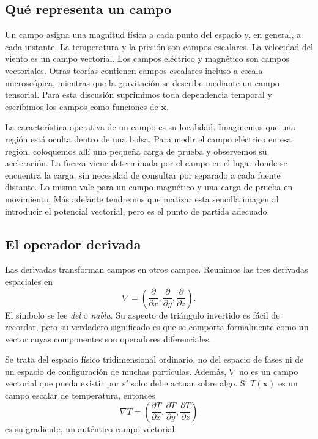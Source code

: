 \subsection{Qué representa un campo}

Un campo asigna una magnitud física a cada punto del espacio y, en general, a cada instante. La temperatura y la presión son campos escalares. La velocidad del viento es un campo vectorial. Los campos eléctrico y magnético son campos vectoriales. Otras teorías contienen campos escalares incluso a escala microscópica, mientras que la gravitación se describe mediante un campo tensorial. Para esta discusión suprimimos toda dependencia temporal y escribimos los campos como funciones de \(\mathbf x\).

La característica operativa de un campo es su localidad. Imaginemos que una región está oculta dentro de una bolsa. Para medir el campo eléctrico en esa región, coloquemos allí una pequeña carga de prueba y observemos su aceleración. La fuerza viene determinada por el campo en el lugar donde se encuentra la carga, sin necesidad de consultar por separado a cada fuente distante. Lo mismo vale para un campo magnético y una carga de prueba en movimiento. Más adelante tendremos que matizar esta sencilla imagen al introducir el potencial vectorial, pero es el punto de partida adecuado.

\subsection{El operador derivada}

Las derivadas transforman campos en otros campos. Reunimos las tres derivadas espaciales en
\begin{equation}
  \nabla
  =
  \left(
    \frac{\partial}{\partial x},
    \frac{\partial}{\partial y},
    \frac{\partial}{\partial z}
  \right).
\end{equation}
El símbolo se lee \emph{del} o \emph{nabla}. Su aspecto de triángulo invertido es fácil de recordar, pero su verdadero significado es que se comporta formalmente como un vector cuyas componentes son operadores diferenciales.

Se trata del espacio físico tridimensional ordinario, no del espacio de fases ni de un espacio de configuración de muchas partículas. Además, \(\nabla\) no es un campo vectorial que pueda existir por sí solo: debe actuar sobre algo. Si \(T(\mathbf x)\) es un campo escalar de temperatura, entonces
\begin{equation}
  \nabla T
  =
  \left(
    \frac{\partial T}{\partial x},
    \frac{\partial T}{\partial y},
    \frac{\partial T}{\partial z}
  \right)
\end{equation}
es su gradiente, un auténtico campo vectorial.


